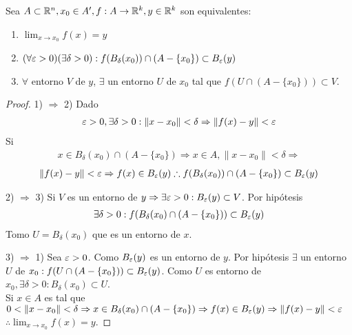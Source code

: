 \begin{prop}
  Sea $A \subset \mathbb{R}^n, x_0 \in A^{\prime}, f: A \to \mathbb{R}^k, y \in \mathbb{R}^k$ son equivalentes:
  \begin{enumerate}
    \item $\lim_{x \to x_0} f(x) = y$
    \item $(\forall \varepsilon > 0)(\exists \delta > 0) : f(B_{\delta}(x_0)) \cap (A - \{x_0\}) \subset B_{\varepsilon}(y)$
    \item $\forall$ entorno $V$ de $y$, $\exists$ un entorno $U$ de $x_0$ tal que $f(U \cap (A - \{x_0\})) \subset V$.
  \end{enumerate}

  \begin{proof}
    1) $\Rightarrow$ 2) Dado \begin{align*}
      \varepsilon > 0, \exists \delta > 0 : \|x - x_0 \| < \delta \Rightarrow \|f(x) - y\| < \varepsilon
    \end{align*} Si \begin{align*} x \in B_{\delta}(x_0) \cap (A - \{x_0\}) \Rightarrow x \in A, \|x - x_0\| < \delta \Rightarrow
    \end{align*}
    \begin{align*}
      \|f(x) - y\| < \varepsilon \Rightarrow f(x) \in B_{\varepsilon}(y) \therefore f(B_{\delta}(x_0)) \cap (A - \{x_0\}) \subset B_{\varepsilon}(y)
    \end{align*}

    2) $\Rightarrow$ 3) Si $V$ es un entorno de $y \Rightarrow \exists \varepsilon > 0 : B_{\varepsilon}(y) \subset V$. Por hipótesis \begin{align*}
      \exists \delta > 0 : f(B_{\delta}(x_0) \cap (A - \{x_0\})) \subset B_{\varepsilon}(y)
    \end{align*} Tomo $U = B_{\delta}(x_0)$ que es un entorno de $x$.

    3) $\Rightarrow$ 1) Sea $\varepsilon > 0$. Como $B_{\varepsilon}(y)$ es un entorno de $y$. Por hipótesis $\exists$ un entorno $U$ de $x_0 : f(U \cap (A - \{x_0\})) \subset B_{\varepsilon}(y)$. Como $U$ es entorno de $x_0, \exists \delta > 0 : B_{\delta}(x_0) \subset U$. \\
    Si $x \in A$ es tal que $0 < \|x - x_0\| < \delta \Rightarrow x \in B_{\delta}(x_0) \cap (A - \{x_0\}) \Rightarrow f(x) \in B_{\varepsilon}(y) \Rightarrow \|f(x) - y\| < \varepsilon$ \\
    $\therefore \lim_{x \to x_0} f(x) = y$.
  \end{proof}
\end{prop}

